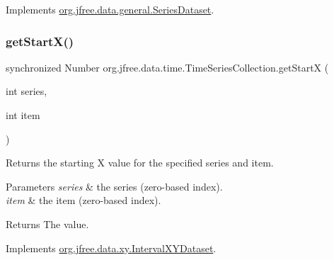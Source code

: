 Implements \mbox{\hyperlink{interfaceorg_1_1jfree_1_1data_1_1general_1_1_series_dataset_a60488892b2314a05a012999e26a74178}{org.\+jfree.\+data.\+general.\+Series\+Dataset}}.

\mbox{\label{classorg_1_1jfree_1_1data_1_1time_1_1_time_series_collection_a20209bf09ed5d7d58e01508a6a53a5fa}} 
\subsubsection{\texorpdfstring{get\+Start\+X()}{getStartX()}}
{\footnotesize\ttfamily synchronized Number org.\+jfree.\+data.\+time.\+Time\+Series\+Collection.\+get\+StartX (\begin{DoxyParamCaption}\item[{int}]{series,  }\item[{int}]{item }\end{DoxyParamCaption})}

Returns the starting X value for the specified series and item.


\begin{DoxyParams}{Parameters}
{\em series} & the series (zero-\/based index). \\
\hline
{\em item} & the item (zero-\/based index).\\
\hline
\end{DoxyParams}
\begin{DoxyReturn}{Returns}
The value. 
\end{DoxyReturn}


Implements \mbox{\hyperlink{interfaceorg_1_1jfree_1_1data_1_1xy_1_1_interval_x_y_dataset_a7548ec7d60d72463313dc6f10aceee62}{org.\+jfree.\+data.\+xy.\+Interval\+X\+Y\+Dataset}}.

\mbox{\label{classorg_1_1jfree_1_1data_1_1time_1_1_time_series_collection_a39159edbe3d2f1ee4e990eba2294ca1e}} 
